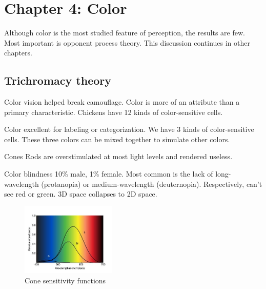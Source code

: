 \section{Chapter 4: Color}
\graphicspath{ {pngs/ch4/} }


\secttoc

Although color is the most studied feature of perception, the results are few.
Most important is opponent process theory.
This discussion continues in other chapters.

\begin{mdframed}\begin{multicols}{2}
\subsection{Trichromacy theory}
Color vision helped break camouflage. Color is more of an attribute than a
primary characteristic.
Chickens have 12 kinds of color-sensitive cells.
\begin{compactdesc}
    \item[Color] excellent for labeling or categorization. We have 3 kinds
        of color-sensitive cells. These three  colors can be mixed together
        to simulate other colors.
    \item[Cones]
        Rods are overstimulated at most light levels and rendered useless.
    \item[Color blindness] 10\% male, 1\% female. Most common is the lack of
        long-wavelength (protanopia) or medium-wavelength (deuternopia).
        Respectively, can't see red or green. 3D space collapses to 2D space.
\end{compactdesc}
    \begin{figure}[H]
        \centering
        \includegraphics[width=0.4\textwidth]{cone_sensitivity.png}
        \caption{Cone sensitivity functions}
    \end{figure}


\end{multicols}\end{mdframed}



